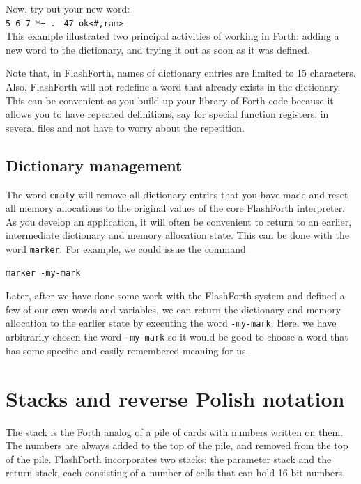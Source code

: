 \documentclass[12pt,a4paper]{article}
\begin{document}
\medskip
Now, try out your new word: \vspace{7pt} \\
\verb!5 6 7 *+ . ! \fbox{$\hookleftarrow$} \verb!47 ok<#,ram>! \vspace{7pt} \\
This example illustrated two principal activities of working in Forth:
adding a new word to the dictionary, and trying it out as soon as it was defined.

\medskip
Note that, in FlashForth, names of dictionary entries are limited to 15 characters.
Also, FlashForth will not redefine a word that already exists in the dictionary.
This can be convenient as you build up your library of Forth code because it allows
you to have repeated definitions, say for special function registers, in several files
and not have to worry about the repetition.

\medskip
\subsection{Dictionary management}
%
The word \verb!empty! will remove all dictionary entries that you have made and
reset all memory allocations to the original values of the core FlashForth interpreter.
As you develop an application, it will often be convenient to return to an earlier, intermediate 
dictionary and memory allocation state. 
This can be done with the word \verb!marker!.
For example, we could issue the command
\begin{verbatim}
marker -my-mark
\end{verbatim}
Later, after we have done some work with the FlashForth system and defined a few of our own words and variables,
we can return the dictionary and memory allocation to the earlier state by executing the word \verb!-my-mark!.
Here, we have arbitrarily chosen the word \verb!-my-mark! so it would be good to choose a word that has
some specific and easily remembered meaning for us.


\bigskip
\section{Stacks and reverse Polish notation}
\label{sec:stacks-and-rpn}
%
The stack is the Forth analog of a pile of cards with numbers written on them.
The numbers are always added to the top of the pile, and removed from the top of the pile.
FlashForth incorporates two stacks: the parameter stack and the return stack,
each consisting of a number of cells that can hold 16-bit numbers.
\end{document}
